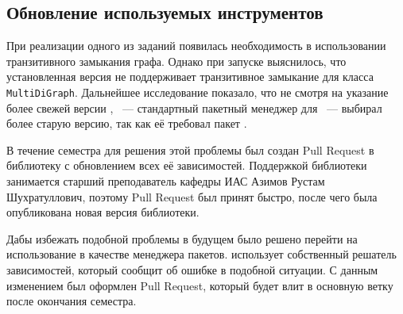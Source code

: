 \subsection{Обновление используемых инструментов}
\label{subsec:housekeeping}

При реализации одного из заданий появилась необходимость в использовании транзитивного замыкания графа.
Однако при запуске выяснилось, что установленная версия \networkx{} не поддерживает транзитивное замыкание для класса \texttt{MultiDiGraph}.
Дальнейшее исследование показало, что не смотря на указание более свежей версии \networkx{}, \pip{}~--- стандартный пакетный менеджер для \python{}~--- выбирал более старую версию, так как её требовал пакет \cfpqdata{}.

В течение семестра для решения этой проблемы был создан Pull Request в библиотеку \cfpqdata{} с обновлением всех её зависимостей.
Поддержкой библиотеки занимается старший преподаватель кафедры ИАС Азимов Рустам Шухратуллович, поэтому Pull Request был принят быстро, после чего была опубликована новая версия библиотеки.

Дабы избежать подобной проблемы в будущем было решено перейти на использование \poetry{} в качестве менеджера пакетов.
\poetry{} использует собственный решатель зависимостей, который сообщит об ошибке в подобной ситуации.
С данным изменением был оформлен Pull Request, который будет влит в основную ветку после окончания семестра.
